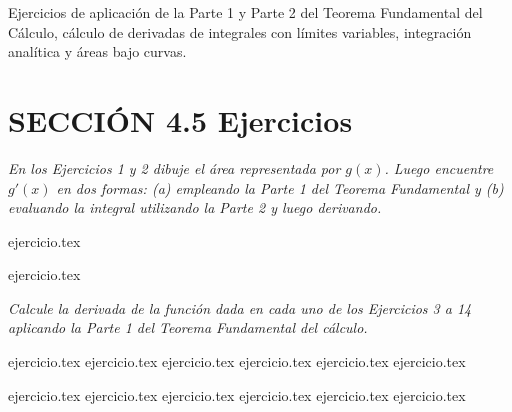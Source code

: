 
Ejercicios de aplicación de la Parte 1 y Parte 2 del Teorema Fundamental del Cálculo, cálculo de derivadas de integrales con límites variables, integración analítica y áreas bajo curvas.

\section*{SECCIÓN 4.5 \quad Ejercicios}

\noindent \textit{En los Ejercicios 1 y 2 dibuje el área representada por $g(x)$. Luego encuentre $g'(x)$ en dos formas: (a) empleando la Parte 1 del Teorema Fundamental y (b) evaluando la integral utilizando la Parte 2 y luego derivando.}

\begin{enumerate}
    \begin{minipage}{0.45\textwidth}
    {ejercicio.tex}
    \end{minipage}%
    \begin{minipage}{0.45\textwidth}
    {ejercicio.tex}
    \end{minipage}
\end{enumerate}

\vspace{1em}
\noindent \textit{Calcule la derivada de la función dada en cada uno de los Ejercicios 3 a 14 aplicando la Parte 1 del Teorema Fundamental del cálculo.}

\begin{enumerate}
    \setcounter{enumi}{2}
    \begin{minipage}{0.45\textwidth}
    {ejercicio.tex}
    {ejercicio.tex}
    {ejercicio.tex}
    {ejercicio.tex}
    {ejercicio.tex}
    {ejercicio.tex}
    \end{minipage}%
    \begin{minipage}{0.45\textwidth}
    {ejercicio.tex}
    {ejercicio.tex}
    {ejercicio.tex}
    {ejercicio.tex}
    {ejercicio.tex}
    {ejercicio.tex}
    \end{minipage}
\end{enumerate}

